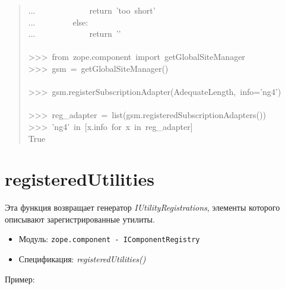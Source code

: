 \documentclass[14pt,a4paper,openany,twoside,final]{extbook}
\providecommand*{\DUroletitlereference}[1]{\textsl{#1}}
\begin{document}
\begin{quote}
{...~~~~~~~~~~~~~return~'too~short'\\
...~~~~~~~~~else:\\
...~~~~~~~~~~~~~return~'{}'\\
~\\
>{}>{}>~from~zope.component~import~getGlobalSiteManager\\
>{}>{}>~gsm~=~getGlobalSiteManager()\\
~\\
>{}>{}>~gsm.registerSubscriptionAdapter(AdequateLength,~info='ng4')\\
~\\
>{}>{}>~reg\_adapter~=~list(gsm.registeredSubscriptionAdapters())\\
>{}>{}>~'ng4'~in~{[}x.info~for~x~in~reg\_adapter{]}\\
True
}
\end{quote}


\section*{registeredUtilities%
  \label{registeredutilities}%
}

Эта функция возвращает генератор \DUroletitlereference{IUtilityRegistrations}, элементы
которого описывают зарегистрированные утилиты.

\begin{itemize}

\item Модуль: \texttt{zope.component - IComponentRegistry}

\item Спецификация: \DUroletitlereference{registeredUtilities()}

\end{itemize}

Пример:
\end{document}
